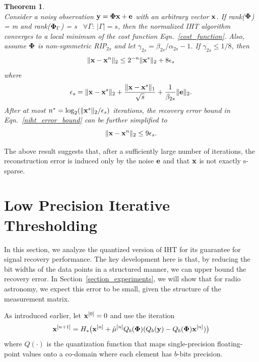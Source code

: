 \documentclass{article}
\newtheorem{theorem}{Theorem}
\begin{document}
\begin{theorem}\label{guarantee_niht}
{\rm{\cite{blumensath2010niht}}}\\
Consider a noisy observation ${\bf y} = {\bf \Phi x} + {\bf e}$ with an arbitrary vector ${\bf x}$. If rank({${\bf \Phi}$}) = m and rank(${\bf \Phi}_{\Gamma}$) = s \ $\forall \Gamma:\ |\Gamma| = s$, then the normalized IHT algorithm converges to a local minimum of the cost function Eqn.~\ref{cost_function}. Also, assume ${\bf \Phi}$ is non-symmetric RIP$_{2s}$ and let $\gamma_{2s} = \beta_{2s}/\alpha_{2s}-1$. If $\gamma_{2s} \leq {1}/{8}$, then
\begin{equation}
    \| {\bf x}-{\bf x}^n\|_2 \leq 2^{-n}\| {\bf x}^s\|_2 + 8 {{\bf \epsilon}_s}\label{niht_error_bound}
\end{equation} where \begin{equation}
     {{\bf \epsilon}_s} =  \| {\bf x}-{\bf x}^s\|_2 + \frac{\| {\bf x}-{\bf x}^s\|_1}{\sqrt{s}}+\frac{1}{\beta_{2s}}\|{\bf e} \|_2.
\end{equation}
After at most $n^*=\log_2(\|{\bf x}^s\|_2/ {\bf \epsilon}_s)$ iterations, the recovery error bound in Eqn.~\ref{niht_error_bound} can be further simplified to
\begin{equation}
   \| {\bf x}-{\bf x}^n\|_2 \leq 9 {{\bf \epsilon}_s}.
\end{equation}
\end{theorem}
The above result suggests that, after a sufficiently large number of iterations, the reconstruction error is induced only by the noise ${\bf e}$ and that ${\bf x}$ is not exactly s-sparse.

\section{Low Precision Iterative Thresholding}\label{section_lpiht}

In this section, we analyze the
quantized version of IHT for 
its guarantee for signal recovery performance.
The key development here is that, by reducing the bit widths of the data points in a structured manner, we
can upper bound the recovery error. 
In Section~\ref{section_experiments},
we will show that for radio astronomy,
we expect this error to be small, given
the structure of the measurement matrix.

As introduced earlier, let ${\bf x}^{[0]} = 0$ and use the iteration
\begin{equation} \label{modified_update_rule}
  {\bf x}^{[n+1]} = H_s\big({\bf x}^{[n]}+\hat{\mu}^{[n]} Q_b(\boldsymbol{\Phi})(Q_b({\bf y})-Q_b(\boldsymbol{\Phi}){\bf x}^{[n]})\big)  
\end{equation}
where $Q(\cdot)$ is the quantization function that maps single-precision floating-point values onto a co-domain where each element has $b$-bits precision.
\end{document}
